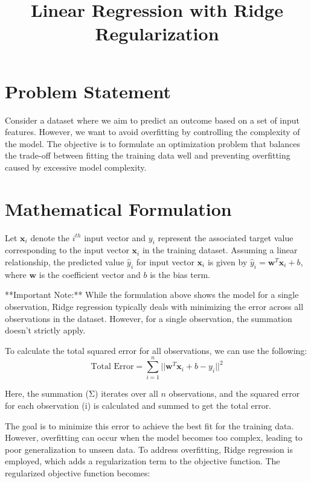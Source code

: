 \documentclass{article}
\begin{document}
\title{Linear Regression with Ridge Regularization}
\author{}
\date{}
\maketitle

\section*{Problem Statement}

Consider a dataset where we aim to predict an outcome based on a set of input features. However, we want to avoid overfitting by controlling the complexity of the model. The objective is to formulate an optimization problem that balances the trade-off between fitting the training data well and preventing overfitting caused by excessive model complexity.

\section*{Mathematical Formulation}

Let $\mathbf{x}_i$ denote the $i^{th}$ input vector and $y_i$ represent the associated target value corresponding to the input vector $\mathbf{x}_i$ in the training dataset. Assuming a linear relationship, the predicted value $\hat{y}_i$ for input vector $\mathbf{x}_i$ is given by $\hat{y}_i = \mathbf{w}^T \mathbf{x}_i + b$, where $\mathbf{w}$ is the coefficient vector and $b$ is the bias term.

**Important Note:** While the formulation above shows the model for a single observation, Ridge regression typically deals with minimizing the error across all observations in the dataset. However, for a single observation, the summation doesn't strictly apply. 

To calculate the total squared error for all observations, we can use the following:
\[
\text{Total Error} = \sum_{i=1}^n || \mathbf{w}^T \mathbf{x}_i + b - y_i ||^2
\]

Here, the summation (Σ) iterates over all $n$ observations, and the squared error for each observation (i) is calculated and summed to get the total error.

The goal is to minimize this error to achieve the best fit for the training data. However, overfitting can occur when the model becomes too complex, leading to poor generalization to unseen data. To address overfitting, Ridge regression is employed, which adds a regularization term to the objective function. The regularized objective function becomes:
\end{document}
